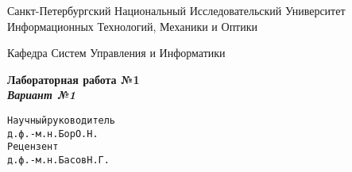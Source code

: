 \begin{titlepage}
  \begin{center}
  \vspace{2cm}
  Санкт-Петербургский Национальный Исследовательский Университет\\
  Информационных Технологий, Механики и Оптики

  \vspace{6cm}

  Кафедра Систем Управления и Информатики

  \vspace{3cm}
  \textbf{Лабораторная работа №1 \\ \textit{Вариант №1}}
  \end{center}

  \hfill
  \begin{alltt}
        Научный руководитель
        д.ф.-м.н. Бор О.Н.
        Рецензент
        д.ф.-м.н. Басов Н.Г.
  \end{alltt}

  
\end{titlepage}